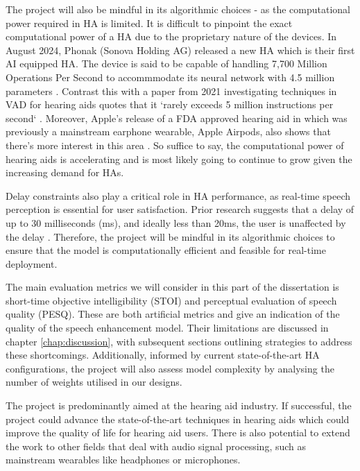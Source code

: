 \documentclass[logo,bsc,singlespacing,parskip,online]{infthesis}
\begin{document}
The project will also be mindful in its algorithmic choices - as the computational
power required in HA is limited. It is difficult to pinpoint the exact computational power of a HA
due to the proprietary nature of the devices. In August 2024,
Phonak (Sonova Holding AG) released a new HA which is their first AI 
equipped HA. The device is said to be capable of handling 7,700 Million 
Operations Per Second to accommmodate its neural network with 4.5 million parameters \citep{Hasemann2024PhonakSphere}.  Contrast this with a paper 
from 2021 investigating techniques in VAD for hearing aids 
quotes that it `rarely exceeds 5 million instructions per second` \citep{Gomez2021MIPS}.
Moreover, Apple's release of a FDA approved hearing aid in which was previously a mainstream earphone wearable,
Apple Airpods, also shows that there's more interest in this area \citep{Apple2025Airpods}.
So suffice to say, the computational power of hearing aids is accelerating 
and is most likely going to continue to grow given the increasing demand 
for HAs.

Delay constraints also play a critical role in HA performance, as real-time speech perception is essential for user satisfaction.
Prior research suggests that a delay of up to 30 milliseconds (ms), and ideally less than 20ms, the user
is unaffected by the delay \citep{Stone2002Delays}. Therefore, the project will be mindful in its algorithmic choices to ensure that the model
is computationally efficient and feasible for real-time deployment.

The main evaluation metrics we will consider in this part of the dissertation 
is short-time objective intelligibility (STOI) and perceptual evaluation of speech quality (PESQ). 
These are both artificial metrics and give an indication of the quality of the speech enhancement model. 
Their limitations are discussed in chapter \ref{chap:discussion}, with subsequent sections outlining strategies to address these shortcomings.
Additionally, informed by current state-of-the-art HA configurations, the project will also assess model complexity by analysing the number of weights utilised in our designs.

The project is predominantly aimed at the hearing aid industry. If successful, the project
could advance the state-of-the-art techniques in hearing aids which 
could improve the quality of life for hearing aid users.
There is also potential to extend the work to other fields that deal with audio signal processing,
such as mainstream wearables like headphones or microphones.
\end{document}
